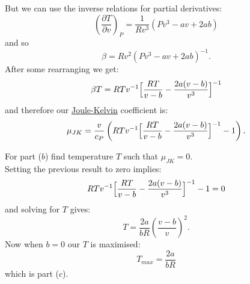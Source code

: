 \begin{enumerate}
    But we can use the inverse relations for
    partial derivatives:
    $$\left(\frac{\partial T}{\partial v}\right)_P
    =\frac{1}{Rv^3}\left(Pv^3-av+2ab\right)$$
    and so
    $$\beta=Rv^2\left(Pv^3-av+2ab\right)^{-1}.$$
    After some rearranging we get:
    $$\beta T=RTv^{-1}
    \Bigl[\frac{RT}{v-b}-\frac{2a(v-b)}{v^3}\Bigr]^{-1}$$
    and therefore our \underline{Joule-Kelvin} coefficient is:
    $$\mu_{JK}=\frac{v}{c_P}
    \left(RTv^{-1}\Bigl[\frac{RT}{v-b}
    -\frac{2a(v-b)}{v^3}\Bigr]^{-1}-1\right).$$

    \newpage

    For part ($b$) find temperature $T$
    such that $\mu_{JK}=0$. \\

    Setting the previous result to zero implies:
    $$RTv^{-1}\Bigl[\frac{RT}{v-b}
    -\frac{2a(v-b)}{v^3}\Bigr]^{-1}-1=0$$
    and solving for $T$ gives:
    $$T=\frac{2a}{bR}\left(\frac{v-b}{v}\right)^2.$$
    Now when $b=0$ our $T$ is maximised:
    $$T_{max}=\frac{2a}{bR}$$
    which is part ($c$).
\end{enumerate}